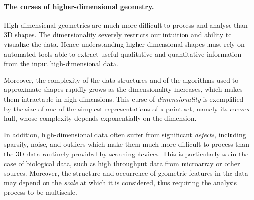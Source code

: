 



\paragraph{The curses of higher-dimensional geometry.} 

High-dimensional geometries are much more difficult to process and analyse than 3D shapes. The dimensionality severely restricts our intuition and ability to visualize the data. Hence  understanding higher dimensional shapes must rely on automated tools able to extract useful qualitative and quantitative information from the input high-dimensional data.

Moreover, the complexity of the data structures and of the algorithms used to  approximate shapes  rapidly grows as the dimensionality increases, which makes them intractable in high dimensions.  This curse of {\em dimensionality} is exemplified by the size of one of the simplest representations of a point set, namely its convex hull, whose complexity depends exponentially on the dimension. 

In addition, high-dimensional data often suffer from significant {\em defects}, including sparsity, noise, and outliers  which make them much more difficult to process than the 3D data routinely provided by scanning devices. This is particularly so in the case of biological data, such as high throughput data from microarray or other sources. Moreover, the structure and occurrence of geometric features in the data may depend on the {\em scale} at which it is considered, thus requiring the analysis process to be multiscale.  

